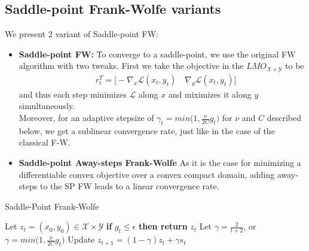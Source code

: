 \documentclass{article}
\begin{document}
\subsection{Saddle-point Frank-Wolfe variants}
We present 2 variant of Saddle-point FW:
\begin{itemize}
    \item \textbf{Saddle-point FW:} To converge to a saddle-point, we use the original FW algorithm with two tweaks. First we take the objective in the $LMO_{\mathcal{X}\times\mathcal{Y}}$ to be
    \begin{equation*}
    \begin{aligned}
        &r_{t}^{T}=\Big[-\nabla_{x} \mathcal{L}(x_{t},y_{t})\quad \nabla_{y} \mathcal{L}(x_{t},y_{t})\Big]
    \end{aligned}
    \end{equation*}  
    and thus each step minimizes $\mathcal{L}$ along $x$ and miximizes it along $y$ simultaneously.\\
    Moreover, for an adaptive stepsize of $\gamma_{t}= \textit{min}\Big(1,\frac{\nu}{2C}g_{t}\Big)$ for $\nu$ and $C$ described below, we get a sublinear convergence rate, just like in the case of the classical F-W.
    \item \textbf{Saddle-point Away-steps Frank-Wolfe} As it is the case for minimizing a differentiable convex objective over a convex compact domain, adding away-steps to the SP FW leads to a linear convergence rate.
\end{itemize}
\begin{algorithm}[tb]
   \caption{Saddle-Point Frank-Wolfe}
   \label{alg:example}
\begin{algorithmic}
   \STATE Let $z_{t}=(x_{0},y_{0})\in\mathcal{X}\times\mathcal{Y}$
   \STATE \textbf{if } $g_{t}\leq\epsilon$ \textbf{ then return } $z_{t}$
   \STATE Let $\gamma = \frac{2}{t+2}$, or $\gamma=\textit{min}\Big(1,\frac{\nu}{2C}g_{t}\Big)$
   \STATE Update $z_{t+1}= (1-\gamma)z_{t}+ \gamma s_{t}$
   \ENDFOR
\end{algorithmic}
\end{algorithm}
\end{document}
